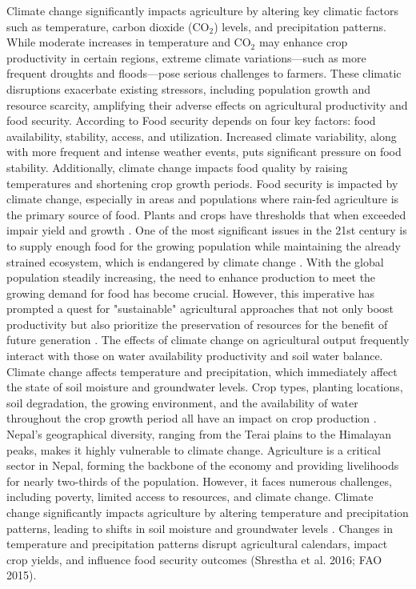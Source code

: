 Climate change significantly impacts agriculture by altering key climatic factors such as temperature, carbon dioxide (CO$_2$) levels, and precipitation patterns. While moderate increases in temperature and CO$_2$ may enhance crop productivity in certain regions, extreme climate variations—such as more frequent droughts and floods—pose serious challenges to farmers. These climatic disruptions exacerbate existing stressors, including population growth and resource scarcity, amplifying their adverse effects on agricultural productivity and food security\parencite{global_paudel_2015}. According to \textcite{kangClimateChangeImpacts2009} Food security depends on four key factors: food availability, stability, access, and utilization. Increased climate variability, along with more frequent and intense weather events, puts significant pressure on food stability. Additionally, climate change impacts food quality by raising temperatures and shortening crop growth periods. Food security is impacted by climate change, especially in areas and populations where rain-fed agriculture is the primary source of food. Plants and crops have thresholds that when exceeded impair yield and growth \parencite{mulunehImpactClimateChange2021}. One of the most significant issues in the 21st century is to supply enough food for the growing population while maintaining the already strained ecosystem, which is endangered by climate change \parencite{kangClimateChangeImpacts2009}.
With the global population steadily increasing, the need to enhance production to meet the growing demand for food has become crucial. However, this imperative has prompted a quest for "sustainable" agricultural approaches that not only boost productivity but also prioritize the preservation of resources for the benefit of future generation \parencite{singhSocioeconomicStatusQualitative2022}. 
The effects of climate change on agricultural output frequently interact with those on water availability productivity and soil water balance. Climate change affects temperature and precipitation, which immediately affect the state of soil moisture and groundwater levels. Crop types, planting locations, soil degradation, the growing environment, and the availability of water throughout the crop growth period all have an impact on crop production \parencite{risalImpactClimateChange2022}.
Nepal's geographical diversity, ranging from the Terai plains to the Himalayan peaks, makes it highly vulnerable to climate change. Agriculture is a critical sector in Nepal, forming the backbone of the economy and providing livelihoods for nearly two-thirds of the population. However, it faces numerous challenges, including poverty, limited access to resources, and climate change. Climate change significantly impacts agriculture by altering temperature and precipitation patterns, leading to shifts in soil moisture and groundwater levels \parencite{gyawaliOverviewAgricultureNepal2021}. Changes in temperature and precipitation patterns disrupt agricultural calendars, impact crop yields, and influence food security outcomes (Shrestha et al. 2016; FAO 2015). 
